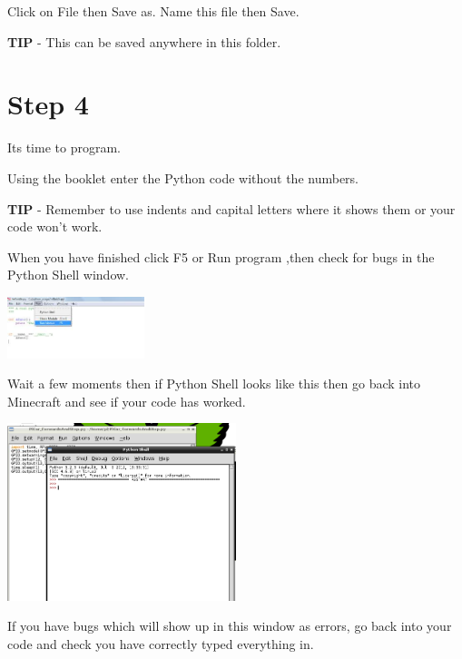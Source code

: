 \documentclass{geocraft-worksheet-multipage}
\begin{document}
Click on File then Save as. Name this file then Save.\vspace{0.4cm}

\textbf{TIP} - This can be saved anywhere in this folder.

\section*{Step 4}

Its time to program.\vspace{0.4cm}

Using the booklet enter the Python code without the numbers.\vspace{0.4cm}

\textbf{TIP} - Remember to use indents and capital letters where it
shows them or your code won’t work. \vspace{0.4cm}

When you have finished click F5 or Run program ,then check for bugs in
the Python Shell window.\vspace{0.4cm}

\includegraphics[width=0.3\textwidth]{pic6}\vspace{0.4cm}

Wait a few moments then if Python Shell looks like this then go back
into Minecraft and see if your code has worked. \vspace{0.4cm}


\includegraphics[width=0.5\textwidth]{pic7}\vspace{0.4cm}

If you have bugs which will show up in this window as errors, go back
into your code and check you have correctly typed everything
in. 
\end{document}
